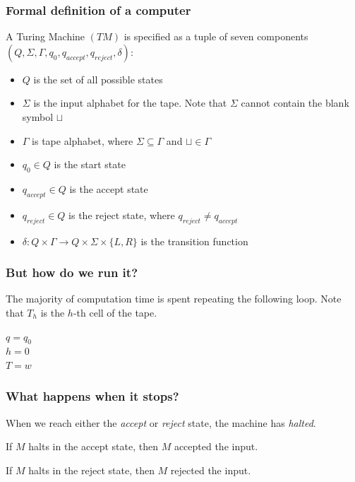 \documentclass[aspectratio=169]{beamer}
\begin{document}
\begin{frame}
\frametitle{Formal definition of a computer}
A Turing Machine $(TM)$ is specified as a tuple of seven components $(Q, \Sigma, \Gamma, q_0, q_{accept}, q_{reject}, \delta)$:

\begin{itemize}
    \item<1-> $Q$ is the set of all possible states
    \item<2-> $\Sigma$ is the input alphabet for the tape. Note that $\Sigma$ cannot contain the blank symbol $\sqcup$
    \item<3-> $\Gamma$ is tape alphabet, where $\Sigma \subseteq \Gamma$ and $\sqcup \in \Gamma$
    \item<4-> $q_0 \in Q$ is the start state
    \item<5-> $q_{accept} \in Q$ is the accept state
    \item<6-> $q_{reject} \in Q$ is the reject state, where $q_{reject} \neq q_{accept}$
    \item<7-> $\delta: Q \times \Gamma \to Q \times \Sigma \times \{L, R\}$ is the transition function
\end{itemize}
\end{frame}

\begin{frame}
\frametitle{But how do we run it?}
The majority of computation time is spent repeating the following loop. Note that $T_h$ is the $h$-th cell of the tape.
\begin{algorithm}[H]
$q = q_0$\\
$h = 0$\\
$T = w$ 
\end{algorithm}
\end{frame}

\begin{frame}
\frametitle{What happens when it stops?}
When we reach either the {\em accept} or {\em reject} state, the machine has {\em halted}.

If $M$ halts in the accept state, then $M$ accepted the input.

If $M$ halts in the reject state, then $M$ rejected the input.
\end{frame}
\end{document}

